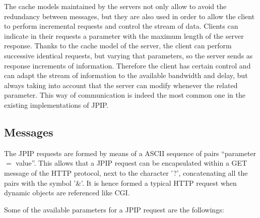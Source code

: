 The cache models maintained by the servers not only
allow to avoid the redundancy between messages, but they
are also used in order to allow the client to perform
incremental requests and control the stream of data. Clients can 
indicate in their requests a parameter with the maximum length
of the server response. Thanks to the cache model of
the server, the client can perform successive identical requests,
but varying that parameters, so the server sends as response
increments of information. Therefore the client has certain
control and can adapt the stream of information to the available
bandwidth and delay, but always taking into account that the server
can modify whenever the related parameter. This way of communication
is indeed the most common one in the existing implementations of
JPIP.

\subsection{Messages}

The JPIP requests are formed by means of a ASCII sequence of pairs
``parameter $=$ value''. This allows that a JPIP request can be encapsulated
within a GET message of the HTTP protocol, next to the 
character '?', concatenating all the pairs with the symbol '\&'. It is
hence formed a typical HTTP request when dynamic objects are referenced
like CGI.

Some of the available parameters for a JPIP request are the followings:

